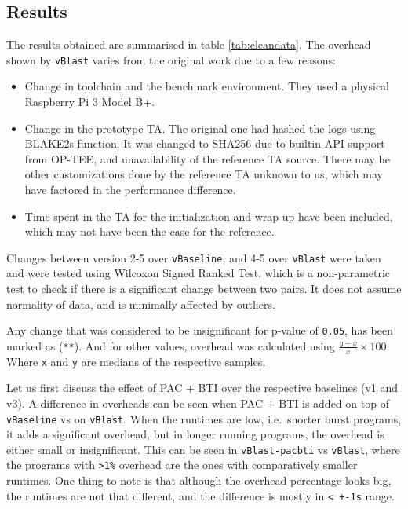 \documentclass[a4paper, nobind]{templates/ociamthesis}
\providecommand{\tightlist}{%
  \setlength{\itemsep}{0pt}\setlength{\parskip}{0pt}}
\begin{document}
\subsection{Results}\label{results}

The results obtained are summarised in table \ref{tab:cleandata}.
The overhead shown by \texttt{vBlast} varies from the original work due to a few reasons:

\begin{itemize}
\tightlist
\item
  Change in toolchain and the benchmark environment. They used a physical Raspberry Pi 3 Model B+.
\item
  Change in the prototype TA. The original one had hashed the logs using BLAKE2s function.
  It was changed to SHA256 due to builtin API support from OP-TEE, and unavailability of the reference TA source.
  There may be other customizations done by the reference TA unknown to us, which
  may have factored in the performance difference.
\item
  Time spent in the TA for the initialization and wrap up have been included, which
  may not have been the case for the reference.
\end{itemize}

Changes between version 2-5 over \texttt{vBaseline}, and 4-5 over \texttt{vBlast} were taken and were
tested using Wilcoxon Signed Ranked Test, which is a non-parametric test to
check if there is a significant change between two pairs.
It does not assume normality of data, and is minimally affected by outliers.

Any change that was considered to be insignificant for p-value of \texttt{0.05}, has
been marked as (\texttt{**}). And for other values, overhead was calculated using
\(\frac{y - x}{x} \times 100\). Where \texttt{x} and \texttt{y} are medians of the respective samples.

Let us first discuss the effect of PAC + BTI over the respective baselines (v1 and v3).
A difference in overheads can be seen when PAC + BTI is added on top of \texttt{vBaseline} vs on \texttt{vBlast}.
When the runtimes are low, i.e.~shorter burst programs, it adds a significant overhead,
but in longer running programs, the overhead is either small or insignificant.
This can be seen in \texttt{vBlast-pacbti} vs \texttt{vBlast}, where the programs with \texttt{\textgreater{}1\%} overhead
are the ones with comparatively smaller runtimes.
One thing to note is that although the overhead percentage looks big, the runtimes
are not that different, and the difference is mostly in \texttt{\textless{}\ +-1s} range.
\end{document}
